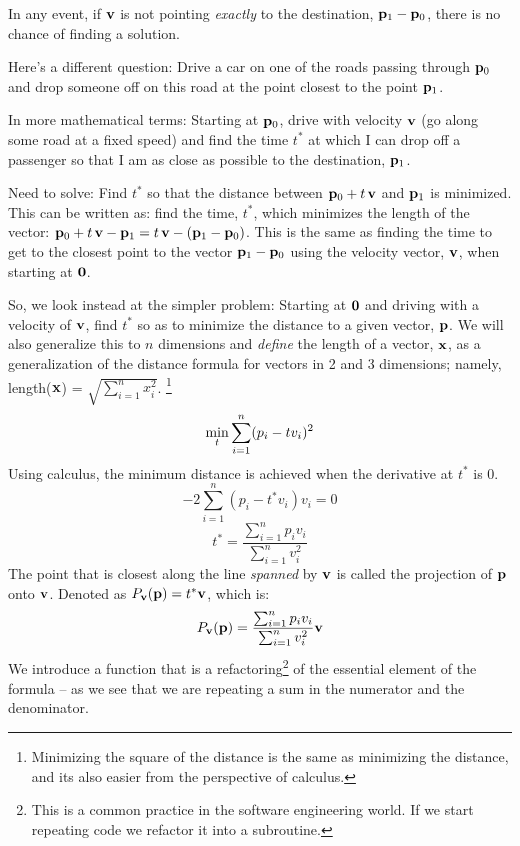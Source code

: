 \documentclass[12pt]{article}
\begin{document}
{In any event, if ${\bf v}$ is not pointing {\em exactly\/} to the destination, 
${\bf p}_1 - {\bf p}_0$, there is no chance of finding a solution.

Here's a different question: Drive a car on one of the roads passing through 
${\bf p}_0$ and drop someone off on this road at the point closest to the  
point ${\bf p}_1$. 

In more mathematical terms: Starting at ${\bf p}_0$, drive with velocity 
${\bf v}$ (go along some road at a fixed speed) and find the time $t^*$ at 
which I can drop off a passenger so that I am as close as possible to the 
destination, ${\bf p}_1$. 

Need to solve: Find $t^*$ so that the distance between 
${\bf p}_0 + t \, {\bf v}$ and ${\bf p}_1$ is minimized.
This can be written as: find the time, $t^*$, which minimizes the length of the
vector:
${\bf p}_0 + t\, {\bf v} - {\bf p}_1 =  t \, {\bf v} - ({\bf p}_1 - {\bf p}_0)$.
This is the same as finding the time to get to the closest point to the 
vector ${\bf p}_1 - {\bf p}_0$ using the velocity vector, ${\bf v}$, 
when starting at ${\bf 0}$.

So, we look instead at the simpler problem: Starting at ${\bf 0}$ and 
driving with a velocity of ${\bf v}$, find $t^*$ so as to minimize the 
distance to a given vector, ${\bf p}$.
We will also generalize this to $n$ dimensions and {\em define\/} the 
length of a vector, ${\bf x}$, as a generalization of the distance formula 
for vectors in 2 and 3  dimensions; namely, 
length(${\bf x}$) = $\sqrt{\sum_{i=1}^n x_i^2}$.%
\footnote{Minimizing the square of the distance is the same as minimizing 
the distance, and its also easier from the perspective of calculus.}
$$ \mathop{\rm min}_{t} \sum_{i=1}^n (p_i - t v_i)^2 $$
Using calculus, the minimum distance is achieved when the derivative 
at $t^*$ is $0$.$$ -2 \sum_{i=1}^n (p_i - t^* v_i)v_i = 0$$
$$t^* = \frac{\sum_{i=1}^n p_i v_i}{\sum_{i=1}^n v_i^2}$$
The point that is closest along the line {\em spanned\/} by ${\bf v}$ is 
called the projection of ${\bf p}$ onto ${\bf v}$.
Denoted as $P_{\bf v}({\bf p}) = t^* {\bf v}$, which is:
$$ P_{\bf v}({\bf p}) = \frac{\sum_{i=1}^n p_i v_i}{\sum_{i=1}^n v_i^2} \bf v $$
We introduce a function that is a refactoring\footnote{This is a common 
practice in the software engineering world. If we start repeating code we 
refactor it into a subroutine.} of the essential element of the formula  -- as 
we see that we are repeating a sum in the numerator and the denominator.

}
\end{document}

